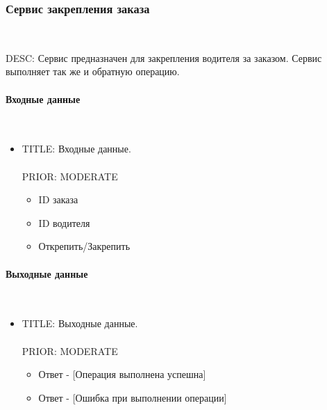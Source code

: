 \subsubsection{Сервис закрепления заказа} \mbox{} \\ \label{fasten_order_service}
  
  DESC: Сервис предназначен для закрепления водителя за заказом. Сервис выполняет так же и обратную операцию.

	\paragraph{Входные данные} \mbox{} \\ \label{}

      \begin{itemize}

        \item{

          TITLE: Входные данные.\\
          \\
          PRIOR: MODERATE\\

        }

        \begin{itemize}
          \item ID заказа 
          \item ID водителя 
          \item Открепить/Закрепить
        \end{itemize}

      \end{itemize}

    \paragraph{Выходные данные} \mbox{} \\

      \begin{itemize}

        \item{

          TITLE: Выходные данные.\\
          \\
          PRIOR: MODERATE\\

        }

        \begin{itemize}
          \item Ответ - [Операция выполнена успешна]
          \item Ответ - [Ошибка при выполнении операции]
        \end{itemize}

      \end{itemize}

